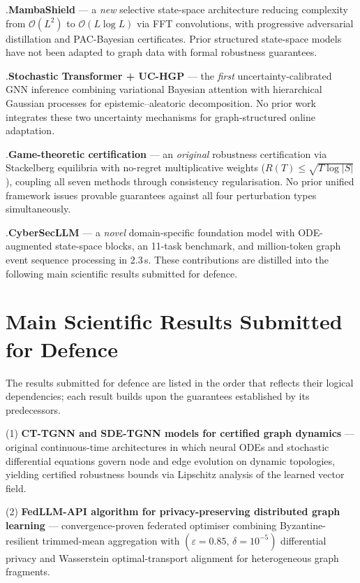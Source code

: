 .\quad \textbf{MambaShield} --- a \emph{new} selective state-space architecture reducing complexity from $\mathcal{O}(L^{2})$ to $\mathcal{O}(L\log L)$ via FFT convolutions, with progressive adversarial distillation and PAC-Bayesian certificates. Prior structured state-space models have not been adapted to graph data with formal robustness guarantees.

.\quad \textbf{Stochastic Transformer + UC-HGP} --- the \emph{first} uncertainty-calibrated GNN inference combining variational Bayesian attention with hierarchical Gaussian processes for epistemic--aleatoric decomposition. No prior work integrates these two uncertainty mechanisms for graph-structured online adaptation.

.\quad \textbf{Game-theoretic certification} --- an \emph{original} robustness certification via Stackelberg equilibria with no-regret multiplicative weights ($R(T)\!\leq\!\sqrt{T\log|S|}$), coupling all seven methods through consistency regularisation. No prior unified framework issues provable guarantees against all four perturbation types simultaneously.

.\quad \textbf{CyberSecLLM} --- a \emph{novel} domain-specific foundation model with ODE-augmented state-space blocks, an 11-task benchmark, and million-token graph event sequence processing in 2.3\,s. These contributions are distilled into the following main scientific results submitted for defence.


\section*{Main Scientific Results Submitted for Defence}

The results submitted for defence are listed in the order that reflects their logical dependencies; each result builds upon the guarantees established by its predecessors.

(1) \textbf{CT-TGNN and SDE-TGNN models for certified graph dynamics} --- original continuous-time architectures in which neural ODEs and stochastic differential equations govern node and edge evolution on dynamic topologies, yielding certified robustness bounds via Lipschitz analysis of the learned vector field.

(2) \textbf{FedLLM-API algorithm for privacy-preserving distributed graph learning} --- convergence-proven federated optimiser combining Byzantine-resilient trimmed-mean aggregation with $(\varepsilon{=}0.85,\,\delta{=}10^{-5})$ differential privacy and Wasserstein optimal-transport alignment for heterogeneous graph fragments.

